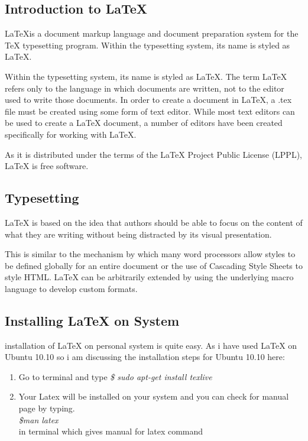\subsection{Introduction to \LaTeX}


\LaTeX is a document markup language and document preparation system for the \TeX{} typesetting  program. Within the typesetting system, its name is styled as \LaTeX.

 
\begin{screen}
 Within the typesetting system, its name is styled as \LaTeX. The term \LaTeX{} refers only to the language in which documents are written, not to the editor used to write those documents. In order to create a document in \LaTeX, a .tex file must be created using some form of text editor. While most text editors can be used to create a \LaTeX{} document, a number of editors have been created specifically for working with \LaTeX.

As it is distributed under the terms of the \LaTeX{} Project Public License (LPPL), \LaTeX{} is free software.
\newpage
\subsection{Typesetting}
\LaTeX{} is based on the idea that authors should be able to focus on the content of what they are writing without being distracted by its visual presentation. 

\par This is similar to the mechanism by which many word processors allow styles to be defined globally for an entire document or the use of Cascading Style Sheets to style HTML. \LaTeX{} can be arbitrarily extended by using the underlying macro language to develop custom formats. 
 

\subsection{Installing \LaTeX{} on System}
installation of \LaTeX{} on personal system is quite easy. As i have used \LaTeX{} on Ubuntu 10.10 so i am discussing the installation steps for Ubuntu 10.10 here:

\begin{enumerate}
\item Go to terminal and type\newline
\emph{\$ sudo apt-get install texlive}

\item Your Latex will be installed on your system and you can check for manual page by typing.\\
\emph{\$man latex}\\
in terminal which gives manual for latex command

\end{enumerate}



\end{screen}

 
